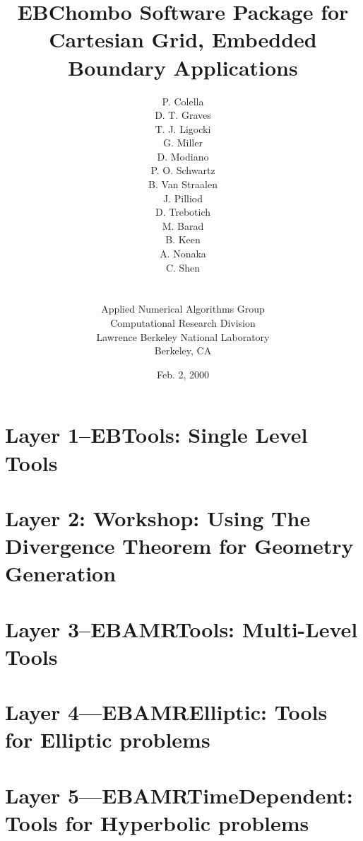 \documentclass[12pt]{report}
\title{EBChombo Software Package for Cartesian Grid, 
        Embedded Boundary Applications}
\author{P. Colella \\
        D. T. Graves \\ 
        T. J. Ligocki \\ 
        G. Miller \\
        D. Modiano \\ 
        P. O. Schwartz \\ 
        B. Van Straalen \\ 
        J. Pilliod \\
        D. Trebotich \\
        M. Barad \\
        B. Keen \\
        A. Nonaka \\
        C. Shen \\
        \\ \\
Applied Numerical Algorithms Group \\
Computational Research Division \\
Lawrence Berkeley National Laboratory \\
Berkeley, CA}
\date{Feb. 2, 2000}
\begin{document}
\maketitle

 

\tableofcontents

\chapter{Layer 1--EBTools:  Single Level Tools}



\chapter{Layer 2: Workshop: Using The Divergence Theorem for Geometry Generation}

\chapter{Layer 3--EBAMRTools:  Multi-Level Tools}


\chapter{Layer 4---EBAMRElliptic:  Tools for Elliptic problems}





\chapter{Layer 5---EBAMRTimeDependent: Tools for Hyperbolic problems}









\end{document}

